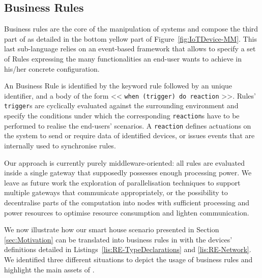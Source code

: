 \subsection{Business Rules}
\label{sec:IoTDSL-BusinessRules}

Business rules are the core of the manipulation of \IOT systems and compose the third part of \IOTDSL as detailed in the bottom yellow part of Figure~\ref{fig:IoTDevice-MM}. This last sub-language relies on an event-based framework that allows to specify a set of \textsf{Rule}s expressing the many functionalities an end-user wants to achieve in his/her concrete configuration. 

An \IOTDSL Business Rule is identified by the keyword \textsf{rule} followed by an unique identifier, and a body of the form << \lstinline[language=iotdsl]{when (trigger) do reaction} >>. Rules' \lstinline[language=iotdsl]{trigger}s are cyclically evaluated against the surrounding environment and specify the conditions under which the corresponding \lstinline[language=iotdsl]{reaction}s have to be performed to realise the end-users' scenarios. A \lstinline[language=iotdsl]{reaction} defines actuations on the \IOT system to send or require data of identified devices, or issues events that are internally used to synchronise rules. 


Our approach is currently purely middleware-oriented: all rules are evaluated inside a single gateway that supposedly possesses enough processing power. We leave as future work the exploration of parallelisation techniques to support multiple gateways that communicate appropriately, or the possibility to decentralise parts of the computation into nodes with sufficient processing and power resources to optimise resource consumption and lighten communication. 

We now illustrate how our smart house scenario presented in Section \ref{sec:Motivation} can be translated into business rules in \IOTDSL with the devices' definitions detailed in Listings~\ref{lis:RE-TypeDeclarations} and \ref{lis:RE-Network}. We identified three different situations to depict the usage of business rules and highlight the main assets of \IOTDSL.

